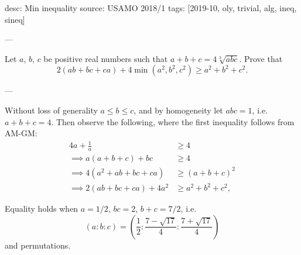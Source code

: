 desc: Min inequality
source: USAMO 2018/1
tags: [2019-10, oly, trivial, alg, ineq, sineq]

---

Let $a$, $b$, $c$ be positive real numbers such that $a+b+c=4\sqrt[3]{abc}$. Prove that \[2(ab+bc+ca)+4\min(a^2,b^2,c^2)\ge a^2+b^2+c^2.\]

---

Without loss of generality $a\le b\le c$, and by homogeneity let $abc=1$, i.e.\ $a+b+c=4$. Then observe the following, where the first inequality follows from AM-GM:
\begin{align*}
    4a+\tfrac1a&\ge 4\\
    \implies a(a+b+c)+bc&\ge 4\\
    \implies 4(a^2+ab+bc+ca)&\ge (a+b+c)^2\\
    \implies 2(ab+bc+ca)+4a^2&\ge a^2+b^2+c^2,
\end{align*}
\begin{remark}
    Equality holds when $a=1/2$, $bc=2$, $b+c=7/2$, i.e.\ \[(a:b:c)=\left(\frac12:\frac{7-\sqrt{17}}4:\frac{7+\sqrt{17}}4\right)\]
    and permutations.
\end{remark}

